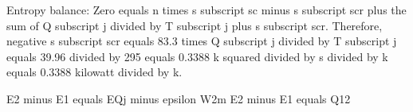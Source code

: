 Entropy balance:
Zero equals n times s subscript sc minus s subscript scr plus the sum of Q subscript j divided by T subscript j plus s subscript scr.
Therefore, negative s subscript scr equals 83.3 times Q subscript j divided by T subscript j equals 39.96 divided by 295 equals 0.3388 k squared divided by s divided by k equals 0.3388 kilowatt divided by k.

E2 minus E1 equals EQj minus epsilon W2m
E2 minus E1 equals Q12